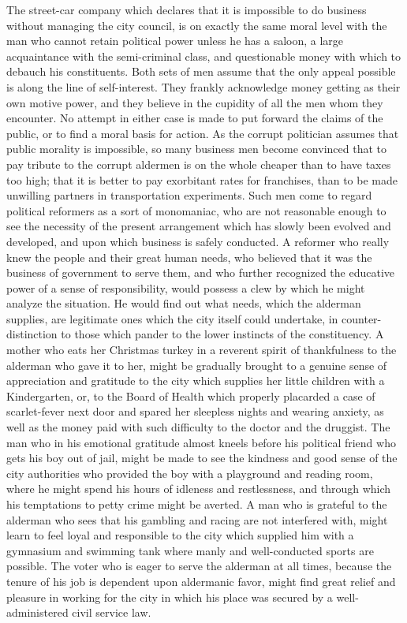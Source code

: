 \documentclass[]{article}
\begin{document}
\begin{sectionbody}
\addamsparagraph The street-car company which declares that it is impossible to do
business without managing the city council, is on exactly the same moral
level with the man who cannot retain political power unless he has a
saloon, a large acquaintance with the semi-criminal class, and
questionable money with which to debauch his constituents. Both sets of
men assume that the only appeal possible is along the line of
self-interest. They frankly acknowledge money getting as their own
motive power, and they believe in the cupidity of all the men whom they
encounter. No attempt in either case is made to put forward the claims
of the public, or to find a moral basis for action. As the corrupt
politician assumes that public morality is impossible, so many business
men become convinced that to pay tribute to the corrupt aldermen is on
the whole cheaper than to have taxes too high; that it is better to pay
exorbitant rates for franchises, than to be made unwilling partners in
transportation experiments. Such men come to regard political reformers
as a sort of monomaniac, who are not reasonable enough to see the
necessity of the present arrangement which has slowly been evolved and
developed, and upon which business is safely conducted. A reformer who
really knew the people and their great human needs, who believed that
it was the business of government to serve them, and who further
recognized the educative power of a sense of responsibility, would
possess a clew by which he might analyze the situation. He would find
out what needs, which the alderman supplies, are legitimate ones which
the city itself could undertake, in counter-distinction to those which
pander to the lower instincts of the constituency. A mother who eats her
Christmas turkey in a reverent spirit of thankfulness to the alderman
who gave it to her, might be gradually brought to a genuine sense of
appreciation and gratitude to the city which supplies her little
children with a Kindergarten, or, to the Board of Health which properly
placarded a case of scarlet-fever next door and spared her sleepless
nights and wearing anxiety, as well as the money paid with such
difficulty to the doctor and the druggist. The man who in his emotional
gratitude almost kneels before his political friend who gets his boy out
of jail, might be made to see the kindness and good sense of the city
authorities who provided the boy with a playground and reading room,
where he might spend his hours of idleness and restlessness, and through
which his temptations to petty crime might be averted. A man who is
grateful to the alderman who sees that his gambling and racing are not
interfered with, might learn to feel loyal and responsible to the city
which supplied him with a gymnasium and swimming tank where manly and
well-conducted sports are possible. The voter who is eager to serve the
alderman at all times, because the tenure of his job is dependent upon
aldermanic favor, might find great relief and pleasure in working for
the city in which his place was secured by a well-administered civil
service law.


\end{sectionbody}
\end{document}
